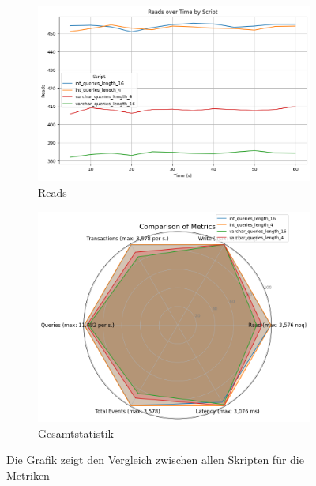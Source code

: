 \vspace{-5pt}
\begin{figure}[H]
    \centering
    \begin{subfigure}[t]{0.48\textwidth}
        \centering
        \includegraphics[width=\textwidth]{PNGs/Script/Join_Typ/join-type/Reads}
        \caption{Reads}
        \label{join-typ-reads}
    \end{subfigure}
    \hfill
    \begin{subfigure}[t]{0.42\textwidth}
        \centering
        \includegraphics[width=\textwidth]{PNGs/Script/Join_Typ/join-type/statistics}
        \caption{Gesamtstatistik}
        \label{fig:join-typ-hex}
    \end{subfigure}
    \caption[Join-Typ: Metrikvergleich]{Die Grafik zeigt den Vergleich zwischen allen Skripten für die Metriken}
    \label{fig:join-typ-comp-metric}
\end{figure}
\vspace{-20pt}


